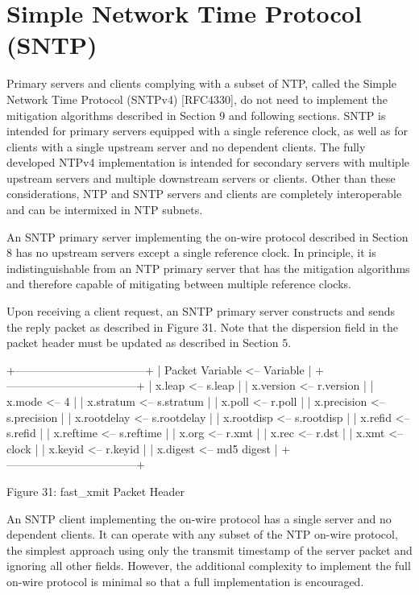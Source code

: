 \chapter{Simple Network Time Protocol (SNTP)}

Primary servers and clients complying with a subset of NTP, called
the Simple Network Time Protocol (SNTPv4) [RFC4330], do not need to
implement the mitigation algorithms described in Section 9 and
following sections.  SNTP is intended for primary servers equipped
with a single reference clock, as well as for clients with a single
upstream server and no dependent clients.  The fully developed NTPv4
implementation is intended for secondary servers with multiple
upstream servers and multiple downstream servers or clients.  Other
than these considerations, NTP and SNTP servers and clients are
completely interoperable and can be intermixed in NTP subnets.

An SNTP primary server implementing the on-wire protocol described in
Section 8 has no upstream servers except a single reference clock.
In principle, it is indistinguishable from an NTP primary server that
has the mitigation algorithms and therefore capable of mitigating
between multiple reference clocks.

Upon receiving a client request, an SNTP primary server constructs
and sends the reply packet as described in Figure 31.  Note that the
dispersion field in the packet header must be updated as described in
Section 5.

                +-----------------------------------+
                | Packet Variable <--   Variable    |
                +-----------------------------------+
                | x.leap        <--     s.leap      |
                | x.version     <--     r.version   |
                | x.mode        <--     4           |
                | x.stratum     <--     s.stratum   |
                | x.poll        <--     r.poll      |
                | x.precision   <--     s.precision |
                | x.rootdelay   <--     s.rootdelay |
                | x.rootdisp    <--     s.rootdisp  |
                | x.refid       <--     s.refid     |
                | x.reftime     <--     s.reftime   |
                | x.org         <--     r.xmt       |
                | x.rec         <--     r.dst       |
                | x.xmt         <--     clock       |
                | x.keyid       <--     r.keyid     |
                | x.digest      <--     md5 digest  |
                +-----------------------------------+

                Figure 31: fast\_xmit Packet Header

An SNTP client implementing the on-wire protocol has a single server
and no dependent clients.  It can operate with any subset of the NTP
on-wire protocol, the simplest approach using only the transmit
timestamp of the server packet and ignoring all other fields.
However, the additional complexity to implement the full on-wire
protocol is minimal so that a full implementation is encouraged.
